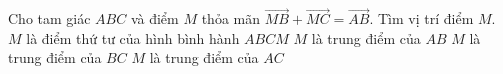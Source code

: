\begin{ex}%
	Cho tam giác $ABC$ và điểm $M$ thỏa mãn $\overrightarrow{MB}+\overrightarrow{MC}=\overrightarrow{AB}$. Tìm vị trí điểm $M$.
	\choice
	{$M$ là điểm thứ tư của hình bình hành $ABCM$}
	{$M$ là trung điểm của $AB$}
	{$M$ là trung điểm của $BC$}
	{\True $M$ là trung điểm của $AC$}
\end{ex}

